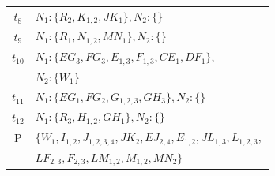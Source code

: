 \begin{table}[t]
\begin{tabular}{|c|l|}
$t_8$ & $N_1:\{R_2,K_{1,2},JK_1\},N_2:\{\}$\\
$t_9$ & $N_1:\{R_1,N_{1,2},MN_1\},N_2:\{\}$\\
$t_{10}$ & $N_1:\{EG_3,FG_3,E_{1,3},F_{1,3},CE_1,DF_1\},$\\
&$N_2:\{W_1\}$\\
$t_{11}$ & $N_1:\{EG_{1},FG_{2},G_{1,2,3},GH_{3}\},N_2:\{\}$\\
$t_{12}$ & $N_1:\{R_3,H_{1,2},GH_1\},N_2:\{\}$\\
P & $\{W_1, I_{1,2}, J_{1,2,3,4},
JK_{2}, EJ_{2,4}, E_{1,2}, JL_{1,3}, L_{1,2,3},$ \\ 
&$LF_{2,3}, F_{2,3}, LM_{1,2}, M_{1,2}, MN_{2}\}$\\
\hline
\end{tabular}
\label{tbl:labelscase1behaviorwoprority}
\end{table}
%

